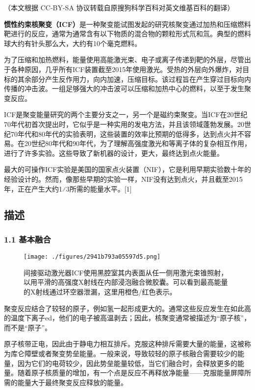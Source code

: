 
（本文根据 CC-BY-SA 协议转载自原搜狗科学百科对英文维基百科的翻译）


\textbf{惯性约束核聚变（ICF）}是一种聚变能试图发起的研究核聚变通过加热和压缩燃料靶进行的反应，通常为通常含有以下物质的混合物的颗粒形式氘和氚。典型的燃料球大约有针头那么大，大约有10个毫克燃料。

为了压缩和加热燃料，能量使用高能激光束、电子或离子传递到靶的外层，尽管出于各种原因，几乎所有ICF装置截至2015年使用激光。受热的外层向外爆炸，对目标的其余部分产生反作用力，向内加速，压缩目标。该过程旨在产生穿过目标向内传播的冲击波。一组足够强大的冲击波可以压缩和加热中心的燃料，以至于发生聚变反应。

ICF是聚变能量研究的两个主要分支之一，另一个是磁约束聚变。当ICF在20世纪70年代初首次提出时，它似乎是一种实用的发电方法，并且该领域蓬勃发展。20世纪70年代和80年代的实验表明，这些装置的效率比预期的低得多，达到点火并不容易。在20世纪80年代和90年代，为了理解高强度激光和等离子体的复杂相互作用，进行了许多实验。这些导致了新机器的设计，更大，最终达到点火能量。

最大的可操作ICF实验是美国的国家点火装置（NIF），它是利用早期实验数十年的经验设计的。然而，像那些早期的实验一样，NIF没有达到点火，并且截至2015年，正在产生大约1⁄3所需的能量水平。[1]

\subsection{描述}
\subsubsection{1.1 基本融合}
\begin{figure}[ht]
\centering
\texttt{[image: ./figures/2941b793a05597d5.png]}
\caption{间接驱动激光器ICF使用黑腔室其内表面从任一侧用激光束锥照射，以用平滑的高强度X射线在内部浸泡融合微胶囊。可以看到最高能量的X射线通过环空器泄漏，这里用橙色/红色表示。} \label{fig_GXYS_1}
\end{figure}
聚变反应结合了较轻的原子，例如氢一起形成更大的。通常这些反应发生在如此高的温度下离子ed，他们的电子被高温剥去；因此，核聚变通常被描述为“原子核”，而不是“原子”。

原子核带正电，因此由于静电力相互排斥。克服这种排斥需要大量的能量，这被称为库仑障壁或者聚变势垒能量。一般来说，导致较轻的原子核融合需要较少的能量，因为它们的电荷较少，因此势垒能量较低，当它们融合时，会释放更多的能量。随着原子核质量的增加，有一个点是反应不再释放净能量——克服能量屏障所需的能量大于最终聚变反应释放的能量。

